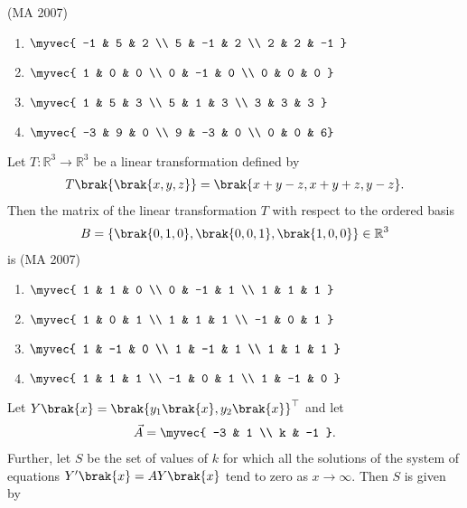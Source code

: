 \hfill{(MA 2007)}
\begin{multicols}{4}
\begin{enumerate}    
        \item $\myvec{ -1 & 5 & 2 \\ 5 & -1 & 2 \\ 2 & 2 & -1 }$
        \item $\myvec{ 1 & 0 & 0 \\ 0 & -1 & 0 \\ 0 & 0 & 0 }$
        \item $\myvec{ 1 & 5 & 3 \\ 5 & 1 & 3 \\ 3 & 3 & 3 }$
        \item $\myvec{ -3 & 9 & 0 \\ 9 & -3 & 0 \\ 0 & 0 & 6}$ 
    \end{enumerate}
    \end{multicols}
\item Let $T:\mathbb{R}^3 \rightarrow \mathbb{R}^3$ be a linear transformation defined by
\begin{align*}
T\brak{\brak{x, y, z}} = \brak{x + y - z, x + y + z, y - z}.
\end{align*}
Then the matrix of the linear transformation $T$ with respect to the ordered basis
\begin{align*}
    B = \{\brak{0,1,0}, \brak{0,0,1}, \brak{1,0,0}\} \in \mathbb{R}^3
\end{align*}
is \hfill{(MA 2007)}
\begin{multicols}{2}
\begin{enumerate}    
        \item $\myvec{ 1 & 1 & 0 \\ 0 & -1 & 1 \\ 1 & 1 & 1 }$
        \item $\myvec{ 1 & 0 & 1 \\ 1 & 1 & 1 \\ -1 & 0 & 1 }$
        \item $\myvec{ 1 & -1 & 0 \\ 1 & -1 & 1 \\ 1 & 1 & 1  }$
        \item $\myvec{ 1 & 1 & 1 \\ -1 & 0 & 1 \\ 1 & -1 & 0 }$ 
    \end{enumerate}
\end{multicols}
\item Let $Y\brak{x} = \brak{y_1\brak{x}, y_2\brak{x}}^\top$ and let
\begin{align*}
\vec{A} = \myvec{ -3 & 1 \\ k & -1 }.
\end{align*}
Further, let $S$ be the set of values of $k$ for which all the solutions of the system of equations $Y'\brak{x} = A Y\brak{x}$ tend to zero as $x \rightarrow \infty$. 
Then $S$ is given by      

